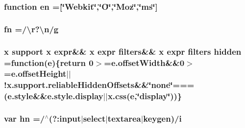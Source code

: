 \subsubsection[{en}]{\setlength{\rightskip}{0pt plus 5cm}function en =\mbox{[}\char`\"{}Webkit\char`\"{},\char`\"{}O\char`\"{},\char`\"{}Moz\char`\"{},\char`\"{}ms\char`\"{}\mbox{]}}\label{_bibabook_2_scripts_2jquery-1_810_82_8min_8js_a5d7a777130eac935addcf4926a74b23c}
\hypertarget{_bibabook_2_scripts_2jquery-1_810_82_8min_8js_acef6bdaf6b9b20fdcca1ea86f0902c3b}{}
\subsubsection[{fn}]{ fn =/\textbackslash{}r?\textbackslash{}n/{\bf g}}\label{_bibabook_2_scripts_2jquery-1_810_82_8min_8js_acef6bdaf6b9b20fdcca1ea86f0902c3b}
\hypertarget{_bibabook_2_scripts_2jquery-1_810_82_8min_8js_a086b6295ec8d15f090cd7239137a4979}{}
\subsubsection[{hidden}]{ {\bf x} {\bf support} {\bf x} {\bf expr}\&\& {\bf x} {\bf expr} filters\&\& {\bf x} {\bf expr} filters hidden =function({\bf e})\{return 0$>$=e.\+offset\+Width\&\&0$>$=e.\+offset\+Height$\vert$$\vert$!x.\+support.\+reliable\+Hidden\+Offsets\&\&\char`\"{}none\char`\"{}===(e.\+style\&\&e.\+style.\+display$\vert$$\vert${\bf x.\+css}({\bf e},\char`\"{}display\char`\"{}))\}}\label{_bibabook_2_scripts_2jquery-1_810_82_8min_8js_a086b6295ec8d15f090cd7239137a4979}
\hypertarget{_bibabook_2_scripts_2jquery-1_810_82_8min_8js_a703d7f6a2aadb540eb051a5f62674194}{}
\subsubsection[{hn}]{\setlength{\rightskip}{0pt plus 5cm}var hn =/$^\wedge$(?\+:input$\vert${\bf select}$\vert$textarea$\vert$keygen)/{\bf i}}\label{_bibabook_2_scripts_2jquery-1_810_82_8min_8js_a703d7f6a2aadb540eb051a5f62674194}
\hypertarget{_bibabook_2_scripts_2jquery-1_810_82_8min_8js_abef68bf244a1159a49fe3a2c153a65d2}{}
